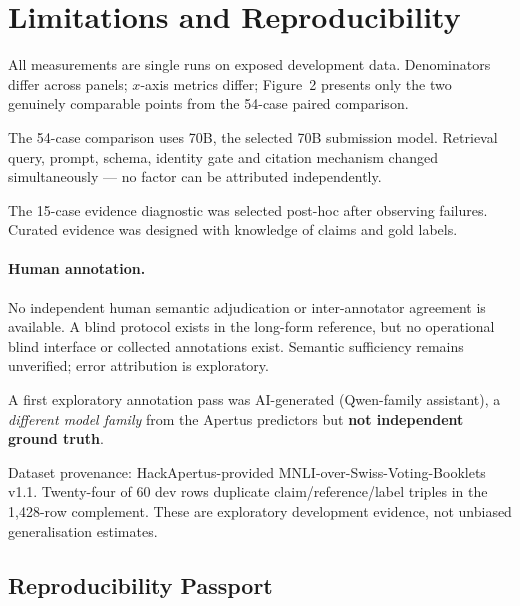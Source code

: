 \documentclass[10pt,a4paper]{article}
\begin{document}
\section{Limitations and Reproducibility}

All measurements are single runs on exposed development data. Denominators differ across panels; $x$-axis metrics differ; Figure~2 presents only the two genuinely comparable points from the 54-case paired comparison.

The 54-case comparison uses 70B, the selected 70B submission model. Retrieval query, prompt, schema, identity gate and citation mechanism changed simultaneously --- no factor can be attributed independently.

The 15-case evidence diagnostic was selected post-hoc after observing failures. Curated evidence was designed with knowledge of claims and gold labels.

\paragraph{Human annotation.}
No independent human semantic adjudication or inter-annotator agreement is available. A blind protocol exists in the long-form reference, but no operational blind interface or collected annotations exist. Semantic sufficiency remains unverified; error attribution is exploratory.

A first exploratory annotation pass was AI-generated (Qwen-family assistant), a \emph{different model family} from the Apertus predictors but \textbf{not independent ground truth}.

Dataset provenance: HackApertus-provided MNLI-over-Swiss-Voting-Booklets v1.1. Twenty-four of 60 dev rows duplicate claim/reference/label triples in the 1{,}428-row complement. These are exploratory development evidence, not unbiased generalisation estimates.

\subsection{Reproducibility Passport}
\end{document}
